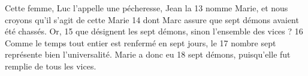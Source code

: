 Cette femme, Luc l'appelle une pécheresse, Jean la	 
13	 	nomme Marie, et nous croyons qu'il s'agit de cette Marie	 
14	 	dont Marc assure que sept démons avaient été chassés. Or,	 
15	 	que désignent les sept démons, sinon l'ensemble des vices ?	 
16	 	Comme le temps tout entier est renfermé en sept jours, le	 
17	 	nombre sept représente bien l'universalité. Marie a donc eu	 
18	 	sept démons, puisqu'elle fut remplie de tous les vices.